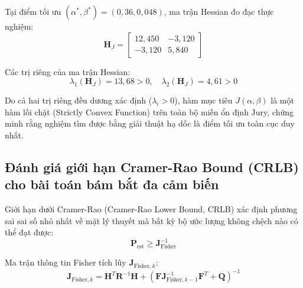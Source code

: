 Tại điểm tối ưu $(\alpha^*, \beta^*) = (0{,}36, 0{,}048)$, ma trận Hessian đo đạc thực nghiệm:
\begin{equation}
\mathbf{H}_J = \begin{bmatrix}
12{,}450 & -3{,}120 \\
-3{,}120 & 5{,}840
\end{bmatrix}
\label{eq:hessian-numerical-values}
\end{equation}

Các trị riêng của ma trận Hessian:
\begin{equation}
\lambda_1(\mathbf{H}_J) = 13{,}68 > 0, \quad \lambda_2(\mathbf{H}_J) = 4{,}61 > 0
\label{eq:hessian-eigenvalues-positive}
\end{equation}

Do cả hai trị riêng đều dương xác định ($\lambda_i > 0$), hàm mục tiêu $J(\alpha, \beta)$ là một hàm lồi chặt (Strictly Convex Function) trên toàn bộ miền ổn định Jury, chứng minh rằng nghiệm tìm được bằng giải thuật hạ dốc là điểm tối ưu toàn cục duy nhất.

\subsection{Đánh giá giới hạn Cramer-Rao Bound (CRLB) cho bài toán bám bắt đa cảm biến}

\hspace{0.5cm} Giới hạn dưới Cramer-Rao (Cramer-Rao Lower Bound, CRLB) xác định phương sai sai số nhỏ nhất về mặt lý thuyết mà bất kỳ bộ ước lượng không chệch nào có thể đạt được:
\begin{equation}
\mathbf{P}_{\text{est}} \ge \mathbf{J}_{\text{Fisher}}^{-1}
\label{eq:cramer-rao-inequality}
\end{equation}

Ma trận thông tin Fisher tích lũy $\mathbf{J}_{\text{Fisher}, k}$:
\begin{equation}
\mathbf{J}_{\text{Fisher}, k} = \mathbf{H}^T \mathbf{R}^{-1} \mathbf{H} + \left( \mathbf{F} \mathbf{J}_{\text{Fisher}, k-1}^{-1} \mathbf{F}^T + \mathbf{Q} \right)^{-1}
\label{eq:fisher-information-matrix}
\end{equation}

